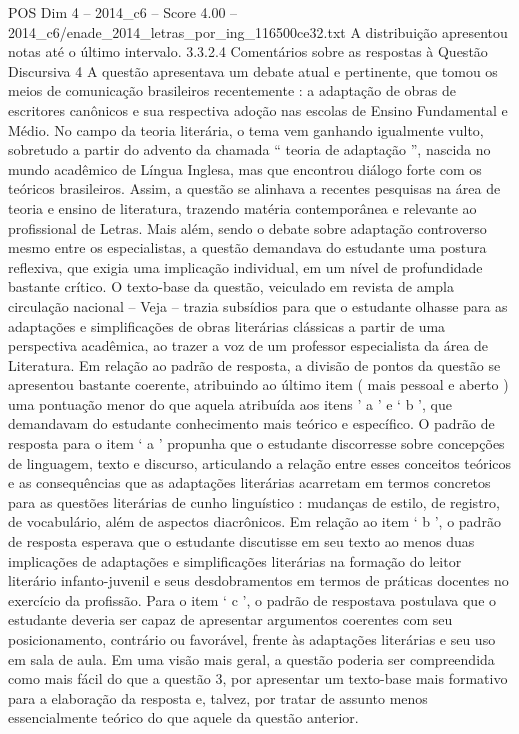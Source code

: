 \begin{textsample}{POS Dim 4 – 2014\_c6 – Score 4.00 – 2014\_c6/enade\_2014\_letras\_por\_ing\_116500ce32.txt}
A distribuição apresentou notas até o último intervalo. 3.3.2.4 Comentários sobre as respostas à Questão Discursiva 4 A questão apresentava um debate atual e pertinente, que tomou os meios de comunicação brasileiros recentemente : a adaptação de obras de escritores canônicos e sua respectiva adoção nas escolas de Ensino Fundamental e Médio.
No campo da teoria literária, o tema vem ganhando igualmente vulto, sobretudo a partir do advento da chamada “ teoria de adaptação ”, nascida no mundo acadêmico de Língua Inglesa, mas que encontrou diálogo forte com os teóricos brasileiros.
Assim, a questão se alinhava a recentes pesquisas na área de teoria e ensino de literatura, trazendo matéria contemporânea e relevante ao profissional de Letras.
Mais além, sendo o debate sobre adaptação controverso mesmo entre os especialistas, a questão demandava do estudante uma postura reflexiva, que exigia uma implicação individual, em um nível de profundidade bastante crítico.
O texto-base da questão, veiculado em revista de ampla circulação nacional – Veja – trazia subsídios para que o estudante olhasse para as adaptações e simplificações de obras literárias clássicas a partir de uma perspectiva acadêmica, ao trazer a voz de um professor especialista da área de Literatura.
Em relação ao padrão de resposta, a divisão de pontos da questão se apresentou bastante coerente, atribuindo ao último item ( mais pessoal e aberto ) uma pontuação menor do que aquela atribuída aos itens ’ a ’ e ‘ b ’, que demandavam do estudante conhecimento mais teórico e específico.
O padrão de resposta para o item ‘ a ’ propunha que o estudante discorresse sobre concepções de linguagem, texto e discurso, articulando a relação entre esses conceitos teóricos e as consequências que as adaptações literárias acarretam em termos concretos para as questões literárias de cunho linguístico : mudanças de estilo, de registro, de vocabulário, além de aspectos diacrônicos.
Em relação ao item ‘ b ’, o padrão de resposta esperava que o estudante discutisse em seu texto ao menos duas implicações de adaptações e simplificações literárias na formação do leitor literário infanto-juvenil e seus desdobramentos em termos de práticas docentes no exercício da profissão.
Para o item ‘ c ’, o padrão de respostava postulava que o estudante deveria ser capaz de apresentar argumentos coerentes com seu posicionamento, contrário ou favorável, frente às adaptações literárias e seu uso em sala de aula.
Em uma visão mais geral, a questão poderia ser compreendida como mais fácil do que a questão 3, por apresentar um texto-base mais formativo para a elaboração da resposta e, talvez, por tratar de assunto menos essencialmente teórico do que aquele da questão anterior.

\end{textsample}
